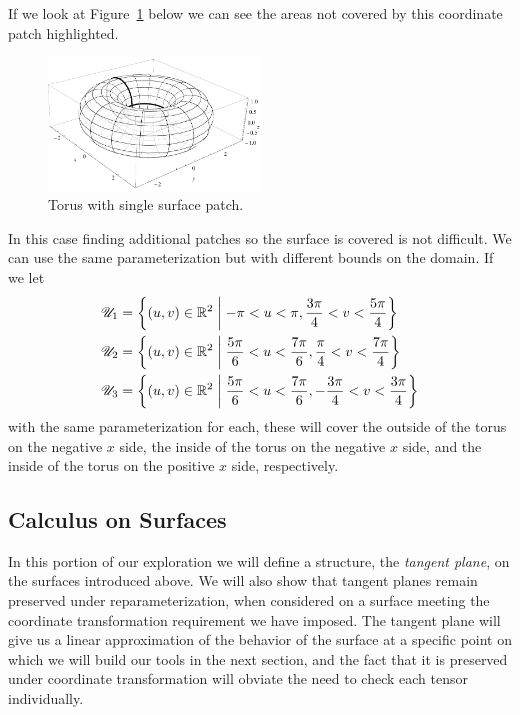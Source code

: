   If we look at Figure~\ref{fig:torus} below we can see the areas not covered by this coordinate patch highlighted.
  \begin{figure}[t] %
    \centering
    \includegraphics[width=0.5\textwidth]{figures/torus.pdf}
    \caption{Torus with single surface patch.}
    \label{fig:torus}
  \end{figure}
  In this case finding additional patches so the surface is covered is not difficult. We can use the same parameterization but with different bounds on the domain. If we let
  \begin{align*}
    \mathscr{U}_1 &= \left\{(u, v) \in \mathbb{R}^2\;\middle\vert\;-\pi < u < \pi, \frac{3\pi}{4} < v < \frac{5\pi}{4}\right\}\\
    \mathscr{U}_2 &= \left\{(u, v) \in \mathbb{R}^2\;\middle\vert\;\frac{5\pi}{6} < u < \frac{7\pi}{6}, \frac{\pi}{4} < v < \frac{7\pi}{4}\right\}\\
    \mathscr{U}_3 &= \left\{(u, v) \in \mathbb{R}^2\;\middle\vert\;\frac{5\pi}{6} < u < \frac{7\pi}{6}, -\frac{3\pi}{4} < v < \frac{3\pi}{4}\right\}
  \end{align*}
  with the same parameterization for each, these will cover the outside of the torus on the negative $x$ side, the inside of the torus on the negative $x$ side, and the inside of the torus on the positive $x$ side, respectively.



\subsection{Calculus on Surfaces}

  In this portion of our exploration we will define a structure, the \emph{tangent plane}, on the surfaces introduced above. We will also show that tangent planes remain preserved under reparameterization, when considered on a surface meeting the coordinate transformation requirement we have imposed. The tangent plane will give us a linear approximation of the behavior of the surface at a specific point on which we will build our tools in the next section, and the fact that it is preserved under coordinate transformation will obviate the need to check each tensor individually.

